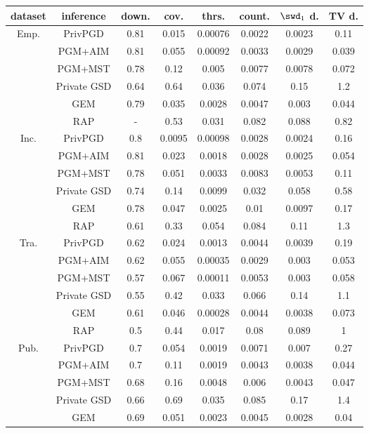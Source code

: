 \begin{table*}[ht]
\centering
\begin{tabular}{cccccccc}
\toprule
dataset & inference & down. & cov. & thrs. & count. & $\swd_1$ d. & TV d. \\
\midrule
\multirow{6}{*}{Emp. } & PrivPGD&0.81 & 0.015 & 0.00076 & 0.0022 & 0.0023 & 0.11 \\
 & PGM+AIM&0.81 & 0.055 & 0.00092 & 0.0033 & 0.0029 & 0.039 \\
 & PGM+MST&0.78 & 0.12 & 0.005 & 0.0077 & 0.0078 & 0.072 \\
 & Private GSD&0.64 & 0.64 & 0.036 & 0.074 & 0.15 & 1.2 \\
 & GEM&0.79 & 0.035 & 0.0028 & 0.0047 & 0.003 & 0.044 \\
 & RAP&- & 0.53 & 0.031 & 0.082 & 0.088 & 0.82 \\
\multirow{6}{*}{Inc. } & PrivPGD&0.8 & 0.0095 & 0.00098 & 0.0028 & 0.0024 & 0.16 \\
 & PGM+AIM&0.81 & 0.023 & 0.0018 & 0.0028 & 0.0025 & 0.054 \\
 & PGM+MST&0.78 & 0.051 & 0.0033 & 0.0083 & 0.0053 & 0.11 \\
 & Private GSD&0.74 & 0.14 & 0.0099 & 0.032 & 0.058 & 0.58 \\
 & GEM&0.78 & 0.047 & 0.0025 & 0.01 & 0.0097 & 0.17 \\
 & RAP&0.61 & 0.33 & 0.054 & 0.084 & 0.11 & 1.3 \\
\multirow{6}{*}{Tra. } & PrivPGD&0.62 & 0.024 & 0.0013 & 0.0044 & 0.0039 & 0.19 \\
 & PGM+AIM&0.62 & 0.055 & 0.00035 & 0.0029 & 0.003 & 0.053 \\
 & PGM+MST&0.57 & 0.067 & 0.00011 & 0.0053 & 0.003 & 0.058 \\
 & Private GSD&0.55 & 0.42 & 0.033 & 0.066 & 0.14 & 1.1 \\
 & GEM&0.61 & 0.046 & 0.00028 & 0.0044 & 0.0038 & 0.073 \\
 & RAP&0.5 & 0.44 & 0.017 & 0.08 & 0.089 & 1 \\
\multirow{6}{*}{Pub. } & PrivPGD&0.7 & 0.054 & 0.0019 & 0.0071 & 0.007 & 0.27 \\
 & PGM+AIM&0.7 & 0.11 & 0.0019 & 0.0043 & 0.0038 & 0.044 \\
 & PGM+MST&0.68 & 0.16 & 0.0048 & 0.006 & 0.0043 & 0.047 \\
 & Private GSD&0.66 & 0.69 & 0.035 & 0.085 & 0.17 & 1.4 \\
 & GEM&0.69 & 0.051 & 0.0023 & 0.0045 & 0.0028 & 0.04 \\

\end{tabular}
\end{table*}
